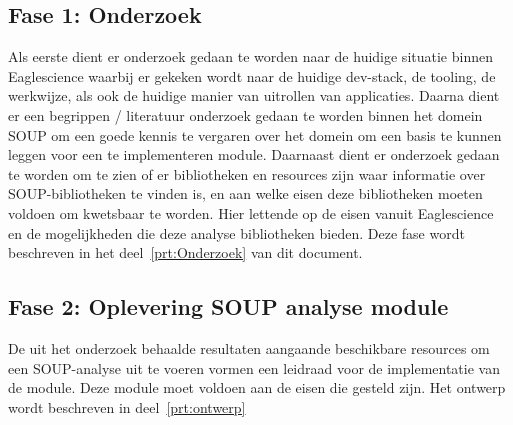 \subsection{Fase 1: Onderzoek} \label{subsec:fase-1:-onderzoek}
Als eerste dient er onderzoek gedaan te worden naar de huidige situatie binnen Eaglescience waarbij er gekeken wordt naar de huidige dev-stack, de tooling, de werkwijze, als ook de huidige manier van uitrollen van applicaties. Daarna dient er een begrippen / literatuur onderzoek gedaan te worden binnen het domein SOUP om een goede kennis te vergaren over het domein om een basis te kunnen leggen voor een te implementeren module. Daarnaast dient er onderzoek gedaan te worden om te zien of er bibliotheken en resources zijn waar informatie over SOUP-bibliotheken te vinden is, en aan welke eisen deze bibliotheken moeten voldoen om kwetsbaar te worden. Hier lettende op de eisen vanuit Eaglescience en de mogelijkheden die deze analyse bibliotheken bieden. Deze fase wordt beschreven in het deel~\ref{prt:Onderzoek} van dit document.

\subsection{Fase 2: Oplevering SOUP analyse module}\label{subsec:fase-2:-oplevering-soup-analyse-module}
De uit het onderzoek behaalde resultaten aangaande beschikbare resources om een SOUP-analyse uit te voeren vormen een leidraad voor de implementatie van de module. Deze module moet voldoen aan de eisen die gesteld zijn. Het ontwerp wordt beschreven in deel~\ref{prt:ontwerp}
